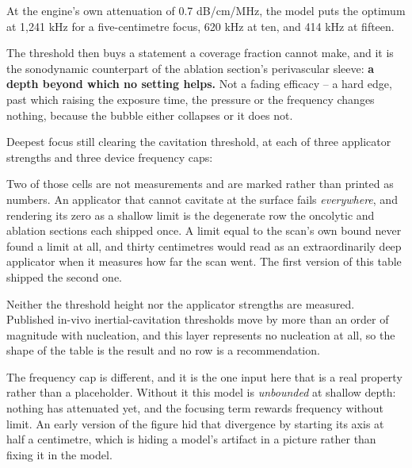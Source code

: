 \documentclass[11pt,twoside,openright]{report}
\begin{document}
\begin{numbers}
At the engine's own attenuation of 0.7 dB/cm/MHz, the model puts the optimum at 1,241 kHz for a five-centimetre focus, 620 kHz at ten, and 414 kHz at fifteen.
\end{numbers}

The threshold then buys a statement a coverage fraction cannot make, and it is the sonodynamic counterpart of the ablation section's perivascular sleeve: \textbf{a depth beyond which no setting helps.} Not a fading efficacy -- a hard edge, past which raising the exposure time, the pressure or the frequency changes nothing, because the bubble either collapses or it does not.

\begin{numbers}
Deepest focus still clearing the cavitation threshold, at each of three applicator strengths and three device frequency caps:








Two of those cells are not measurements and are marked rather than printed as numbers. An applicator that cannot cavitate at the surface fails \textit{everywhere}, and rendering its zero as a shallow limit is the degenerate row the oncolytic and ablation sections each shipped once. A limit equal to the scan's own bound never found a limit at all, and thirty centimetres would read as an extraordinarily deep applicator when it measures how far the scan went. The first version of this table shipped the second one.
\end{numbers}

\begin{refusal}
Neither the threshold height nor the applicator strengths are measured. Published in-vivo inertial-cavitation thresholds move by more than an order of magnitude with nucleation, and this layer represents no nucleation at all, so the shape of the table is the result and no row is a recommendation.

The frequency cap is different, and it is the one input here that is a real property rather than a placeholder. Without it this model is \textit{unbounded} at shallow depth: nothing has attenuated yet, and the focusing term rewards frequency without limit. An early version of the figure hid that divergence by starting its axis at half a centimetre, which is hiding a model's artifact in a picture rather than fixing it in the model.
\end{refusal}
\end{document}
